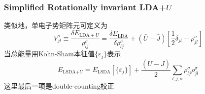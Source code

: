 \documentclass[cjk,slidestop,compress,mathserif,blue]{beamer}
\newcommand{\upcite}[1]{\hspace{0ex}\textsuperscript{\cite{#1}}} %
\begin{document}
\frame
{
	\frametitle{\textrm{Simplified Rotationally invariant LDA+}$U$}
	类似地，单电子势矩阵元可定义为
	\begin{displaymath}
		V_{jl}^{\sigma}\equiv\frac{\delta E_{\mathrm{LDA+}U}}{\rho_{lj}^{\sigma}}=\frac{\delta E_{\mathrm{LDA}}}{\delta \rho_{lj}^{\sigma}}+(\bar U-\bar J)\left[\frac12\delta_{jl}-\rho_{jl}^{\sigma}\right]
	\end{displaymath}
	当总能量用\textrm{Kohn-Sham}本征值$\{\varepsilon_j\}$表示
	\begin{displaymath}
		E_{\textrm{LSDA+}U}=E_{\textrm{LSDA}}[\{\varepsilon_j\}]+\frac{(\bar U-\bar J)}2\sum_{l,j,\sigma}\rho_{lj}^{\sigma}\rho_{jl}^{\sigma}
	\end{displaymath}
	这里最后一项是\textrm{double-counting}校正
}
\end{document}
